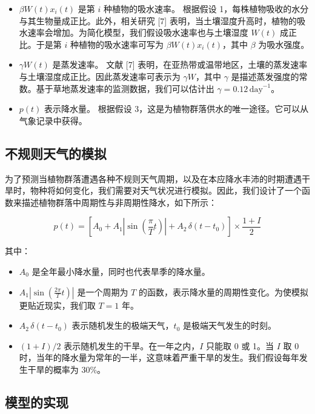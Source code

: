\documentclass[11pt,a4paper]{ctexart}
\begin{document}
\begin{itemize}
\item $\beta W(t)x_i(t)$ 是第 $i$ 种植物的吸水速率。
根据假设 1，每株植物吸收的水分与其生物量成正比。此外，相关研究 [7] 表明，当土壤湿度升高时，植物的吸水速率会增加。为简化模型，我们假设吸水速率也与土壤湿度 $W(t)$ 成正比。于是第 $i$ 种植物的吸水速率可写为 $\beta W(t)x_i(t)$，其中 $\beta$ 为吸水强度。
\item $\gamma W(t)$ 是蒸发速率。
文献 [7] 表明，在亚热带或温带地区，土壤的蒸发速率与土壤湿度成正比。因此蒸发速率可表示为 $\gamma W$，其中 $\gamma$ 是描述蒸发强度的常数。基于草地蒸发速率的监测数据，我们可以估计出 $\gamma=0.12\,\mathrm{day}^{-1}$。
\item $p(t)$ 表示降水量。
根据假设 3，这是为植物群落供水的唯一途径。它可以从气象记录中获得。
\end{itemize}

\subsection{不规则天气的模拟}

为了预测当植物群落遭遇各种不规则天气周期，以及在本应降水丰沛的时期遭遇干旱时，物种将如何变化，我们需要对天气状况进行模拟。因此，我们设计了一个函数来描述植物群落中周期性与非周期性降水，如下所示：

\begin{equation}
p(t)=\left[A_0+A_1\left|\sin\left(\frac{\pi}{T}t\right)\right|+A_2\,\delta(t-t_0)\right]\times\frac{1+I}{2}
\label{eq:precip}
\end{equation}

其中：

\begin{itemize}
\item $A_0$ 是全年最小降水量，同时也代表旱季的降水量。
\item $A_1\left|\sin\left(\frac{2\pi}{T}t\right)\right|$ 是一个周期为 $T$ 的函数，表示降水量的周期性变化。为使模拟更贴近现实，我们取 $T=1$ 年。
\item $A_2\,\delta(t-t_0)$ 表示随机发生的极端天气，$t_0$ 是极端天气发生的时刻。
\item $(1+I)/2$ 表示随机发生的干旱。在一年之内，$I$ 只能取 0 或 1。当 $I$ 取 0 时，当年的降水量为常年的一半，这意味着严重干旱的发生。我们假设每年发生干旱的概率为 30\%。
\end{itemize}

\subsection{模型的实现}
\end{document}
